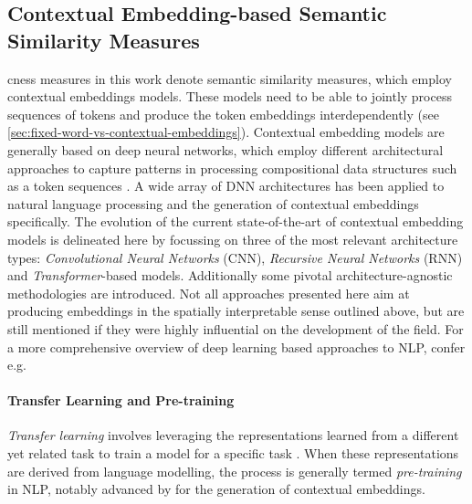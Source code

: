 \documentclass[11pt, numbers=noenddot]{scrreprt}
\let\citef\cite  %
\let\cite\parencite  %
\begin{document}

\subsection{Contextual Embedding-based Semantic Similarity Measures}
\label{sec:contextual-embedding-semantic-similarity}
\gls{cness} measures in this work denote semantic similarity measures, which employ contextual embeddings models. These models need to be able to jointly process sequences of tokens and produce the token embeddings interdependently (see \cref{sec:fixed-word-vs-contextual-embeddings}). Contextual embedding models are generally based on deep neural networks, which employ different architectural approaches to capture patterns in processing compositional data structures such as a token sequences \cite{goodfellowDeepLearning2016}. A wide array of DNN architectures has been applied to natural language processing and the generation of contextual embeddings specifically. The evolution of the current state-of-the-art of contextual embedding models is delineated here by focussing on three of the most relevant architecture types: \textit{Convolutional Neural Networks} (CNN), \textit{Recursive Neural Networks} (RNN) and \textit{Transformer}-based models. Additionally some pivotal architecture-agnostic methodologies are introduced. Not all approaches presented here aim at producing embeddings in the spatially interpretable sense outlined above, but are still mentioned if they were highly influential on the development of the field. For a more comprehensive overview of deep learning based approaches to NLP, confer e.g. \citef{youngRecentTrendsDeep2018, minaeeDeepLearningBased2021, minRecentAdvancesNatural2023}

\paragraph{Transfer Learning and Pre-training} \textit{Transfer learning} involves leveraging the representations learned from a different yet related task to train a model for a specific task \cite{zhuangComprehensiveSurveyTransfer2021}. When these representations are derived from language modelling, the process is generally termed \textit{pre-training} in NLP, notably advanced by \citef{daiSemisupervisedSequenceLearning2015} for the generation of contextual embeddings.
\end{document}
